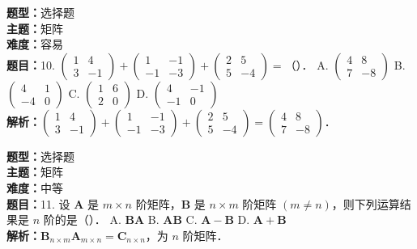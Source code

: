\documentclass{ctexart}
\newenvironment{question}[5]{%
	\noindent\textbf{题型：}#1\\
	\textbf{主题：}#2\\
	\textbf{难度：}#3\\
	\textbf{题目：}#4\\
	\textbf{解析：}#5\\
	\vspace{1em}
}{}
\begin{document}
	\begin{question}
		{选择题}
		{矩阵}
		{容易}
		{10. \(\left(\begin{array}{cc}1 & 4 \\ 3 & -1\end{array}\right)+\left(\begin{array}{cc}1 & -1 \\ -1 & -3\end{array}\right)+\left(\begin{array}{cc}2 & 5 \\ 5 & -4\end{array}\right)=\)（）．
			A. \(\left(\begin{array}{cc}4 & 8 \\ 7 & -8\end{array}\right)\)
			B. \(\left(\begin{array}{cc}4 & 1 \\ -4 & 0\end{array}\right)\)
			C. \(\left(\begin{array}{ll}1 & 6 \\ 2 & 0\end{array}\right)\)
			D. \(\left(\begin{array}{cc}4 & -1 \\ -1 & 0\end{array}\right)\)}
		{\(\left(\begin{array}{cc}1 & 4 \\ 3 & -1\end{array}\right)+\left(\begin{array}{cc}1 & -1 \\ -1&-3\end{array}\right)+\left(\begin{array}{cc}2&5\\5&-4\end{array}\right)=\left(\begin{array}{cc}4 & 8 \\ 7 & -8\end{array}\right)\)．}
	\end{question}
	
	
	\begin{question}
		{选择题}
		{矩阵}
		{中等}
		{11. 设 \(\mathbf{A}\) 是 \(m \times n\) 阶矩阵，\(\mathbf{B}\) 是 \(n \times m\) 阶矩阵 \((m \neq n)\)，则下列运算结果是 \(n\) 阶的是（）．
			A. \(\mathbf{B A}\)
			B. \(\mathbf{A B}\)
			C. \(\mathbf{A}-\mathbf{B}\)
			D. \(\mathbf{A}+\mathbf{B}\)}
		{\(\mathbf{B}_{n \times m} \mathbf{A}_{m \times n}=\mathbf{C}_{n \times n}\)，为 \(n\) 阶矩阵．}
	\end{question}
	
\end{document}
